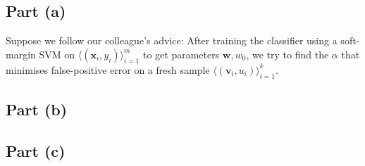 \subsection{Part (a)}

Suppose we follow our colleague's advice: After training the classifier using a soft-margin SVM on $\langle(\mathbf{x}_i,y_i)\rangle_{i=1}^m$ to get parameters $\mathbf{w}, w_0$, we try to find the $\alpha$ that minimises false-positive error on a fresh sample $\langle(\mathbf{v}_i,u_i)\rangle_{i=1}^k$.

\subsection{Part (b)}

\subsection{Part (c)}
